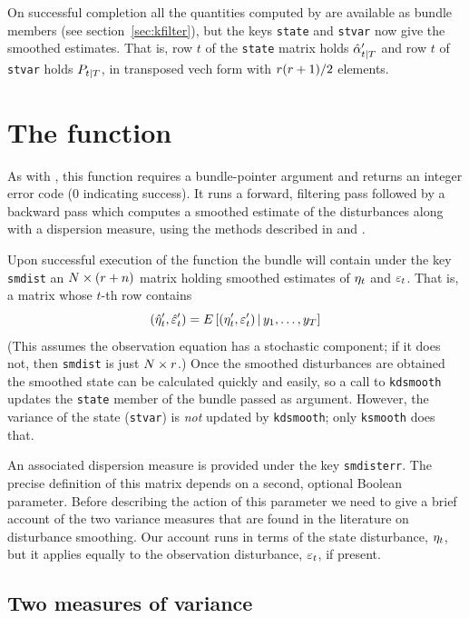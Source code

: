 On successful completion all the quantities computed by 
are available as bundle members (see section~\ref{sec:kfilter}), but
the keys \texttt{state} and \texttt{stvar} now give the smoothed
estimates.  That is, row $t$ of the \texttt{state} matrix holds
$\hat{\alpha}_{t|T}'$ and row $t$ of \texttt{stvar} holds
$P_{t|T}$, in transposed vech form with $r(r +1)/2$
elements.

\section{The  function}
\label{sec:kdsmooth}

As with , this function requires a bundle-pointer
argument and returns an integer error code (0 indicating success).  It
runs a forward, filtering pass followed by a backward pass which
computes a smoothed estimate of the disturbances along with a
dispersion measure, using the methods described in \cite{koopman93}
and \cite{koopman-etal99}.

Upon successful execution of the function the bundle will contain
under the key \texttt{smdist} an $N \times (r + n)$ matrix
holding smoothed estimates of $\eta_t$ and $\varepsilon_t$. That is,
a matrix whose $t$-th row contains
\[
(\hat{\eta}_t' , \hat{\varepsilon}_t')
 = E\left[ (\eta_t' , \varepsilon_t') \,| \,
   y_1, \ldots, y_T \right]
\]
(This assumes the observation equation has a stochastic component; if
it does not, then \texttt{smdist} is just $N \times r$.) Once the
smoothed disturbances are obtained the smoothed state can be
calculated quickly and easily, so a call to \texttt{kdsmooth} updates
the \texttt{state} member of the bundle passed as argument. However,
the variance of the state (\texttt{stvar}) is \textit{not} updated by
\texttt{kdsmooth}; only \texttt{ksmooth} does that.

An associated dispersion measure is provided under the key
\texttt{smdisterr}. The precise definition of this matrix depends on a
second, optional Boolean parameter. Before describing the action of
this parameter we need to give a brief account of the two variance
measures that are found in the literature on disturbance
smoothing. Our account runs in terms of the state disturbance,
$\eta_t$, but it applies equally to the observation disturbance,
$\varepsilon_t$, if present.

\subsection{Two measures of variance}

